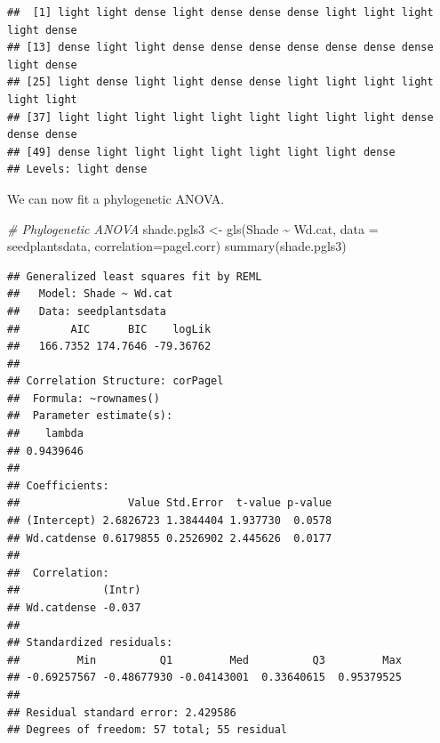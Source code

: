 \documentclass[
]{book}
\newenvironment{Shaded}{\begin{snugshade}}{\end{snugshade}}
\newcommand{\AttributeTok}[1]{\textcolor[rgb]{0.77,0.63,0.00}{#1}}
\newcommand{\CommentTok}[1]{\textcolor[rgb]{0.56,0.35,0.01}{\textit{#1}}}
\newcommand{\DecValTok}[1]{\textcolor[rgb]{0.00,0.00,0.81}{#1}}
\newcommand{\FunctionTok}[1]{\textcolor[rgb]{0.00,0.00,0.00}{#1}}
\newcommand{\NormalTok}[1]{#1}
\newcommand{\OtherTok}[1]{\textcolor[rgb]{0.56,0.35,0.01}{#1}}
\newcommand{\SpecialCharTok}[1]{\textcolor[rgb]{0.00,0.00,0.00}{#1}}
\newcommand{\StringTok}[1]{\textcolor[rgb]{0.31,0.60,0.02}{#1}}
\begin{document}
\begin{Shaded}
\end{Shaded}

\begin{verbatim}
##  [1] light light dense light dense dense dense light light light light dense
## [13] dense light light dense dense dense dense dense dense dense light dense
## [25] light dense light light dense dense light light light light light light
## [37] light light light light light light light light light dense dense dense
## [49] dense light light light light light light light dense
## Levels: light dense
\end{verbatim}

We can now fit a phylogenetic ANOVA.

\begin{Shaded}
\begin{Highlighting}[]
\CommentTok{\# Phylogenetic ANOVA}
\NormalTok{shade.pgls3 }\OtherTok{\textless{}{-}} \FunctionTok{gls}\NormalTok{(Shade }\SpecialCharTok{\textasciitilde{}}\NormalTok{ Wd.cat, }\AttributeTok{data =}\NormalTok{ seedplantsdata, }\AttributeTok{correlation=}\NormalTok{pagel.corr)}
\FunctionTok{summary}\NormalTok{(shade.pgls3)}
\end{Highlighting}
\end{Shaded}

\begin{verbatim}
## Generalized least squares fit by REML
##   Model: Shade ~ Wd.cat 
##   Data: seedplantsdata 
##        AIC      BIC    logLik
##   166.7352 174.7646 -79.36762
## 
## Correlation Structure: corPagel
##  Formula: ~rownames() 
##  Parameter estimate(s):
##    lambda 
## 0.9439646 
## 
## Coefficients:
##                 Value Std.Error  t-value p-value
## (Intercept) 2.6826723 1.3844404 1.937730  0.0578
## Wd.catdense 0.6179855 0.2526902 2.445626  0.0177
## 
##  Correlation: 
##             (Intr)
## Wd.catdense -0.037
## 
## Standardized residuals:
##         Min          Q1         Med          Q3         Max 
## -0.69257567 -0.48677930 -0.04143001  0.33640615  0.95379525 
## 
## Residual standard error: 2.429586 
## Degrees of freedom: 57 total; 55 residual
\end{verbatim}
\end{document}
